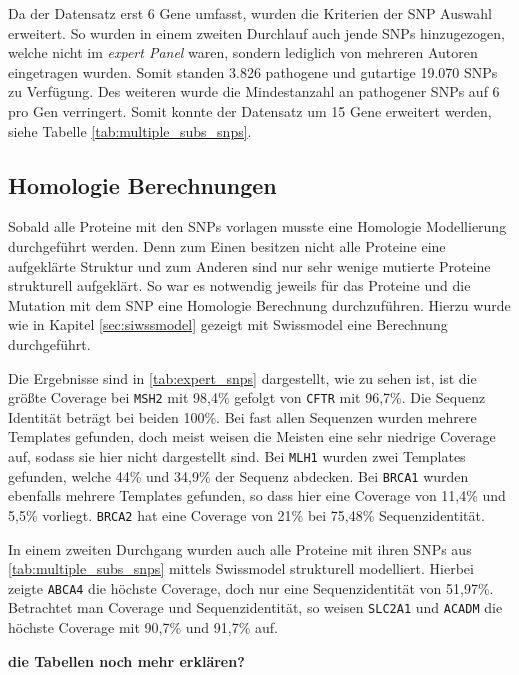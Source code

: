 Da der Datensatz erst 6 Gene umfasst, wurden die Kriterien der \ac{SNP} Auswahl erweitert. So wurden in einem zweiten Durchlauf auch jende \ac{SNPs} hinzugezogen, welche nicht im \emph{expert Panel} waren, sondern lediglich von mehreren Autoren eingetragen wurden. Somit standen 3.826 pathogene und gutartige 19.070 \ac{SNPs} zu Verfügung. Des weiteren wurde die Mindestanzahl an pathogener SNPs auf 6 pro Gen verringert. Somit konnte der Datensatz um 15 Gene erweitert werden, siehe Tabelle \ref{tab:multiple_subs_snps}.


\subsection{Homologie Berechnungen}

Sobald alle Proteine mit den \ac{SNPs} vorlagen musste eine Homologie Modellierung durchgeführt werden. Denn zum Einen besitzen nicht alle Proteine eine aufgeklärte Struktur und zum Anderen sind nur sehr wenige mutierte Proteine strukturell aufgeklärt. So war es notwendig jeweils für das Proteine und die Mutation mit dem \ac{SNP} eine Homologie Berechnung durchzuführen. Hierzu wurde wie in Kapitel \ref{sec:siwssmodel} gezeigt mit Swissmodel eine Berechnung durchgeführt.

Die Ergebnisse sind in \ref{tab:expert_snps} dargestellt, wie zu sehen ist, ist die größte Coverage bei \texttt{MSH2} mit 98,4\% gefolgt von \texttt{CFTR} mit 96,7\%. Die Sequenz Identität beträgt bei beiden 100\%. Bei fast allen Sequenzen wurden mehrere Templates gefunden, doch meist weisen die Meisten eine sehr niedrige Coverage auf, sodass sie hier nicht dargestellt sind. Bei \texttt{MLH1} wurden zwei Templates gefunden, welche 44\% und 34,9\% der Sequenz abdecken. Bei \texttt{BRCA1} wurden ebenfalls mehrere Templates gefunden, so dass hier eine Coverage von 11,4\% und 5,5\% vorliegt. \texttt{BRCA2} hat eine Coverage von 21\% bei 75,48\% Sequenzidentität.

In einem zweiten Durchgang wurden auch alle Proteine mit ihren SNPs aus \ref{tab:multiple_subs_snps} mittels Swissmodel strukturell modelliert. Hierbei zeigte \texttt{ABCA4} die höchste Coverage, doch nur eine Sequenzidentität von 51,97\%. Betrachtet man Coverage und Sequenzidentität, so weisen \texttt{SLC2A1} und \texttt{ACADM} die höchste Coverage mit 90,7\% und 91,7\% auf. 

\textbf{die Tabellen noch mehr erklären?}



